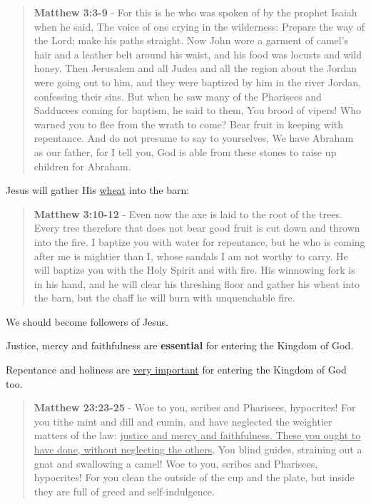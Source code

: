 \documentclass[11pt]{article}
\begin{document}
\begin{quote}
\textbf{Matthew 3:3-9} - For this is he who was spoken of by the prophet Isaiah when he said, The voice of one crying in the wilderness: Prepare the way of the Lord; make his paths straight. Now John wore a garment of camel's hair and a leather belt around his waist, and his food was locusts and wild honey. Then Jerusalem and all Judea and all the region about the Jordan were going out to him, and they were baptized by him in the river Jordan, confessing their sins. But when he saw many of the Pharisees and Sadducees coming for baptism, he said to them, You brood of vipers! Who warned you to flee from the wrath to come? Bear fruit in keeping with repentance. And do not presume to say to yourselves, We have Abraham as our father, for I tell you, God is able from these stones to raise up children for Abraham.
\end{quote}

Jesus will gather His \uline{wheat} into the barn:

\begin{quote}
\textbf{Matthew 3:10-12} - Even now the axe is laid to the root of the trees. Every tree therefore that does not bear good fruit is cut down and thrown into the fire. I baptize you with water for repentance, but he who is coming after me is mightier than I, whose sandals I am not worthy to carry. He will baptize you with the Holy Spirit and with fire. His winnowing fork is in his hand, and he will clear his threshing floor and gather his wheat into the barn, but the chaff he will burn with unquenchable fire.
\end{quote}

We should become followers of Jesus.

Justice, mercy and faithfulness are \textbf{essential} for entering the Kingdom of God.

Repentance and holiness are \uline{very important} for entering the Kingdom of God too.

\begin{quote}
\textbf{Matthew 23:23-25} - Woe to you, scribes and Pharisees, hypocrites! For you tithe mint and dill and cumin, and have neglected the weightier matters of the law: \uline{justice and mercy and faithfulness. These you ought to have done, without neglecting the others}. You blind guides, straining out a gnat and swallowing a camel! Woe to you, scribes and Pharisees, hypocrites! For you clean the outside of the cup and the plate, but inside they are full of greed and self-indulgence.
\end{quote}
\end{document}
